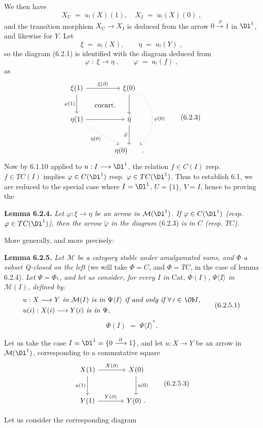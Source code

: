 We then have
\[
X_U \;=\; u_!(X)(1), \quad X_I \;=\; u_!(X)(0)\;,
\]
and the transition morphism $X_U \longrightarrow X_I$ is deduced from the arrow $0 \xrightarrow{\ \partial\ } 1$ in $\Dl^1$, and likewise for $Y$. Let
\[
\xi \;=\; u_!(X), \qquad \eta \;=\; u_!(Y)\;,
\]
so the diagram (6.2.1) is identified with the diagram deduced from
\[
\varphi \;:\; \xi \longrightarrow \eta\;, \qquad \varphi \;=\; u_!(f)\;,
\]
as
\[
\begin{tikzcd}[row sep=large, column sep=large]
\xi(1) \arrow[r, "\xi(\partial)"] \arrow[d, "\varphi(1)"'] \arrow[dr, phantom, "\text{cocart.}"] & \xi(0) \arrow[d] \arrow[dd, dotted, bend left=60, "\varphi(0)"] \\
\eta(1) \arrow[r] \arrow[dr, dotted, "\eta(0)"'] & \tilde{\eta} \arrow[d, "\tilde{\varphi}"'] \\
 & \eta(0) \qquad .
\end{tikzcd}
\tag*{(6.2.3)}
\]
Now by 6.1.10 applied to $u : I \longrightarrow \Dl^1$, the relation $f \in C(I)$ resp. $f \in TC(I)$ implies $\varphi \in C(\Dl^1)$ resp. $\varphi \in TC(\Dl^1)$. Thus to establish 6.1, we are reduced to the special case where $I = \Dl^1$, $U = \{1\}$, $V = I$, hence to proving the

\textbf{Lemma 6.2.4.} \textit{Let $\varphi : \xi \longrightarrow \eta$ be an arrow in $\mathcal{M}(\Dl^1)$. If $\varphi \in C(\Dl^1)$ (resp.}
\textit{$\varphi \in TC(\Dl^1)$), then the arrow $\tilde{\varphi}$ in the diagram} (6.2.3) \textit{is in $C$ (resp. $TC$).}

More generally, and more precisely:

\textbf{Lemma 6.2.5.} \textit{Let $\mathcal{M}$ be a category stable under amalgamated sums, and $\Phi$ a subset Q-closed on the left} (we will take $\Phi = C$, and $\Phi = TC$, in the case of lemma 6.2.4). \textit{Let $\Psi = \Phi_{*}$, and let us consider, for every $I$ in} Cat\textit{, $\Phi(I)$, $\Psi\langle I\rangle$ in $\mathcal{M}(I)$, defined by:}
\[
\begin{aligned}
&\text{\textit{$u : X \longrightarrow Y$ in $\mathcal{M}(I)$ is in $\Psi\langle I\rangle$ if and only if $\forall\, i \in \Ob I$,}}\\
&\text{\textit{$u(i) : X(i) \longrightarrow Y(i)$ is in $\Psi$,}}
\end{aligned}
\tag*{(6.2.5.1)}
\]
\[
\Phi(I) \;=\; \Psi\langle I\rangle^{*}.
\tag*{(6.2.5.2)}
\]

Let us take the case $I = \Dl^1 = \{0 \xrightarrow{\ \partial\ } 1\}$, and let $u : X \longrightarrow Y$ be an arrow in $\mathcal{M}(\Dl^1)$, corresponding to a commutative square
\[
\begin{tikzcd}[row sep=large, column sep=large]
X(1) \arrow[r, "X(\partial)"] \arrow[d, "u(1)"'] & X(0) \arrow[d, "u(0)"] \\
Y(1) \arrow[r, "Y(\partial)"] & Y(0)\;.
\end{tikzcd}
\tag*{(6.2.5.3)}
\]

Let us consider the corresponding diagram